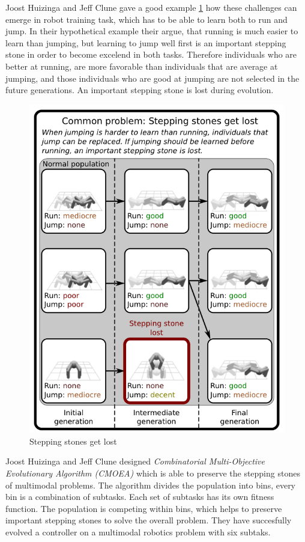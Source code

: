 \documentclass[format=acmsmall, review=false, screen=true]{acmart}
\begin{document}
Joost Huizinga and Jeff Clune gave a good example \ref{fig:jumping_running} how these challenges can emerge in robot training task, which has to be able to learn both to run and jump. In their hypothetical example their argue, that running is much easier to learn than jumping, but learning to jump well first is an important stepping stone in order to become excelend in both tasks. Therefore individuals who are better at running, are more favorable than individuals that are average at jumping, and those individuals who are good at jumping are not selected in the future generations. An important stepping stone is lost during evolution. 

\begin{figure}[H]
  \includegraphics[width=0.46\linewidth]{img/jumping_running.JPEG}
  \caption{\label{fig:jumping_running}Stepping stones get lost}
\end{figure}

Joost Huizinga and Jeff Clune designed \emph{Combinatorial Multi-Objective Evolutionary Algorithm (CMOEA)} which is able to preserve the stepping stones of multimodal problems. The algorithm divides the population into bins, every bin is a combination of subtasks. Each set of subtasks has its own fitness function. The population is competing within bins, which helps to preserve important stepping stones to solve the overall problem. They have succesfully evolved a controller on a multimodal robotics problem with six subtaks.
\end{document}
